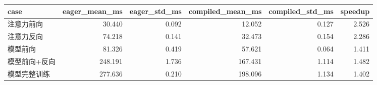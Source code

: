 \begin{tabular}{lrrrrr}
\toprule
case & eager\_mean\_ms & eager\_std\_ms & compiled\_mean\_ms & compiled\_std\_ms & speedup \\
\midrule
注意力前向 & 30.440 & 0.092 & 12.052 & 0.127 & 2.526 \\
注意力反向 & 74.218 & 0.141 & 32.473 & 0.154 & 2.286 \\
模型前向 & 81.326 & 0.419 & 57.621 & 0.064 & 1.411 \\
模型前向+反向 & 248.191 & 1.736 & 167.431 & 1.114 & 1.482 \\
模型完整训练 & 277.636 & 0.210 & 198.096 & 1.134 & 1.402 \\
\bottomrule
\end{tabular}
